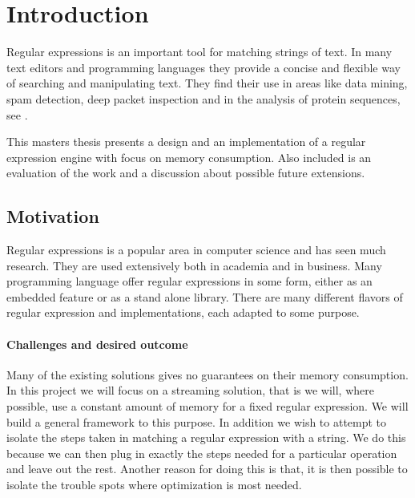 \section{Introduction}
Regular expressions is an important tool for matching strings of
text. In many text editors and programming languages they provide a
concise and flexible way of searching and manipulating text. They find
their use in areas like data mining, spam detection, deep packet
inspection and in the analysis of protein sequences, see
\cite{pedersen2010}.

This masters thesis presents a design and an implementation of a
regular expression engine with focus on memory consumption. Also 
included is an evaluation of the work and a discussion about possible
future extensions.



\subsection{Motivation}

Regular expressions is a popular area in computer science and has seen
much research. They are used extensively both in academia and in
business. Many programming language offer regular expressions in some
form, either as an embedded feature or as a stand alone
library. There are many different flavors of regular expression and
implementations, each adapted to some purpose. 

\paragraph{Challenges and desired outcome}
Many of the existing solutions gives no guarantees on their memory
consumption. In this project we will focus on a streaming solution,
that is we will, where possible, use a constant amount of memory for a
fixed regular expression. We will build a general framework to this
purpose. In addition we wish to attempt to isolate the steps taken in
matching a regular expression with a string. We do this because we can
then plug in exactly the steps needed for a particular operation and
leave out the rest. Another reason for doing this is that, it is then
possible to isolate the trouble spots where optimization is most
needed. 




